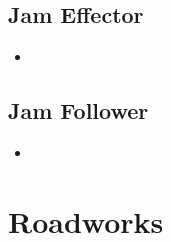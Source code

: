 \subsection{Jam Effector}

\begin{itemize}
    \item 
\end{itemize}

\subsection{Jam Follower}

\begin{itemize}
    \item 
\end{itemize}

\section{Roadworks}


